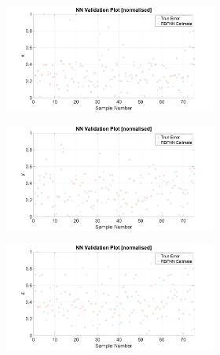 \begin{figure}
  \begin{subfigure}{0.48\textwidth}
    \begin{subfigure}{\textwidth}
      \includegraphics[clip, trim = 100 0 100 0, width=\textwidth]{figures/chapter4/scatter_v_x}
    \end{subfigure}
    \begin{subfigure}{\textwidth}
      \includegraphics[clip, trim = 100 0 100 0, width=\textwidth]{figures/chapter4/scatter_v_y}
    \end{subfigure}
    \begin{subfigure}{\textwidth}
      \includegraphics[clip, trim = 100 0 100 0, width=\textwidth]{figures/chapter4/scatter_v_z}

\end{subfigure}
\end{subfigure}
\end{figure}
